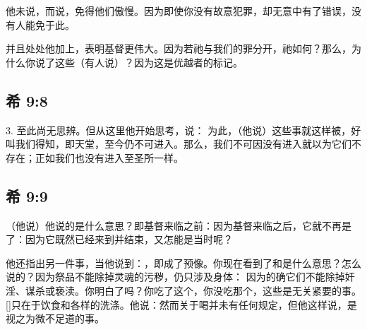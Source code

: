 他未说，而说，免得他们傲慢。因为即使你没有故意犯罪，却无意中有了错误，没有人能免于此。\par

并且处处他加上，表明基督更伟大。因为若祂与我们的罪分开，祂如何？那么，为什么你说了这些（有人说）？因为这是优越者的标记。\par


\subsection{希 9:8}

3. 至此尚无思辨。但从这里他开始思考，说： 为此，（他说）这些事就这样被，好叫我们得知，即天堂，至今仍不可进入。那么，我们不可因没有进入就以为它们不存在；正如我们也没有进入至圣所一样。\par


\subsection{希 9:9}

（他说）他说的是什么意思？即基督来临之前：因为基督来临之后，它就不再是了：因为它既然已经来到并结束，又怎能是当时呢？\par

他还指出另一件事，当他说到：，即成了预像。你现在看到了和是什么意思？怎么说的？因为祭品不能除掉灵魂的污秽，仍只涉及身体：  因为的确它们不能除掉奸淫、谋杀或亵渎。你明白了吗？你吃了这个，你没吃那个，这些是无关紧要的事。[]只在于饮食和各样的洗涤。他说：然而关于喝并未有任何规定，但他这样说，是视之为微不足道的事。\par


